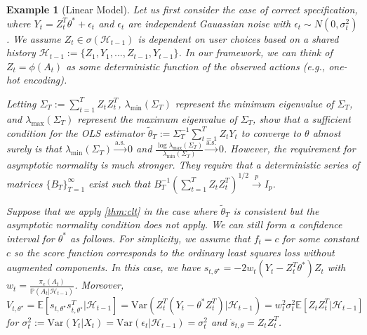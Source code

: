 \documentclass[11pt]{article}
\newcommand{\E}{\mathbb{E}}
\newcommand{\Var}{\mathrm{Var}}
\newtheorem{example}{Example}
\begin{document}
\iffalse
\begin{example}[Linear Model]

Let us first consider the case of correct specification, where $Y_{t} = Z_{t}^{T}\theta^{*}  +\epsilon_{t}$ and $\epsilon_{t}$ are independent Gauassian noise with $\epsilon_{t} \sim N(0,\sigma_{t}^{2})$. We assume $Z_{t} \in \sigma(\mathcal{H}_{t-1})$ is dependent on user choices based on a shared history $\mathcal{H}_{t-1} := \{ Z_{1},Y_{1},...,Z_{t-1},Y_{t-1}\}$. In our framework, we can think of $Z_{t} = \phi(A_t)$ as some deterministic function of the observed actions (e.g., one-hot encoding). 

Letting $\Sigma_{T} := \sum_{t=1}^{T} Z_{t}Z_{t}^{T}$, $\lambda_{\text{min}}(\Sigma_{T})$ represent the minimum eigenvalue of $\Sigma_T$, and $\lambda_{\text{max}}(\Sigma_{T})$ represent the maximum eigenvalue of $\Sigma_T$, \cite{1982laiwei} show that a sufficient condition for the OLS estimator $\tilde{\theta}_{T}:= \Sigma_{T}^{-1} \sum_{t=1}^{T} Z_{t}Y_{t} $ to converge to $\theta$ almost surely is that $\lambda_{\text{min}}(\Sigma_{T}) \overset{\text{a.s.}}{\to} 0 $ and $\frac{\log\lambda_{\text{max}} (\Sigma_{T})}{ \lambda_{\text{min}}(\Sigma_{T})} \overset{\text{a.s.}}{\to} 0 $. However, the requirement for asymptotic normality is much stronger. They require that a deterministic series of matrices $\{B_{T} \}_{T=1}^{\infty}$ exist such that $B_{T}^{-1} (\sum_{t=1}^{T} Z_{t}Z_{t}^{T})^{1/2} \overset{p}{\to} I_{p}$. 

Suppose that we apply \cref{thm:clt} in the case where $\tilde{\theta}_{T}$ is consistent but the asymptotic normality condition does not apply. We can still form a confidence interval for $\theta^*$ as follows. For simplicity, we assume that $f_{t} = c$ for some constant $c$ so the score function corresponds to the ordinary least squares loss without augmented components. In this case, we have $s_{t,\theta^{\star}} = - 2w_{t}(Y_{t} - Z_{t}^{T}\theta^{*} )Z_{t}$ with $w_{t} =\frac{\pi_{e}(A_{t})}{ \mathbb{P} (A_{t}  | \mathcal{H}_{t-1}) }$. Moreover, $$V_{t,\theta^{\star}} = \E\left[s_{t,\theta^{\star}}s_{t,\theta^{\star}}^{T} | \mathcal{H}_{t-1} \right] =\Var\left(Z_{t}^{T}(Y_{t} - \theta^{*}Z_{t}^{T})|\mathcal{H}_{t-1} \right) = w_{t}^{2}\sigma_{t}^{2} \E \left[Z_{t}Z_{t}^{T} |\mathcal{H}_{t-1} \right]$$ for $\sigma_{t}^{2} := \text{Var} \left(Y_{t} | X_{t} \right) =  \text{Var} \left(\epsilon_{t} |\mathcal{H}_{t-1}\right) =\sigma_{t}^{2}$ and $\dot{s}_{t,\theta} = Z_{t}Z_{t}^{T}$.


\end{example}
\end{document}
